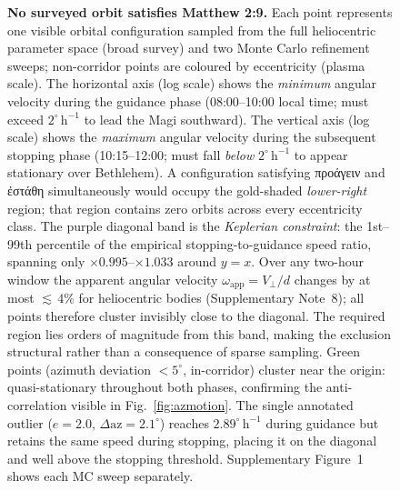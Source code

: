 \documentclass[sn-nature]{sn-jnl}
\newcommand{\grk}[1]{{\fontencoding{LGR}\selectfont #1}}
\newcommand{\grk}[1]{{\greekfont #1}}
\begin{document}
\begin{figure}[h!]
  \caption{\textbf{No surveyed orbit satisfies Matthew 2:9.}
    Each point represents one visible orbital configuration sampled from the
    full heliocentric parameter space (broad survey) and two Monte Carlo
    refinement sweeps; non-corridor points are coloured by eccentricity
    (plasma scale). The horizontal axis (log scale) shows the
    \emph{minimum} angular velocity during the guidance phase
    (08:00–10:00 local time; must exceed $2^\circ\,\mathrm{h}^{-1}$ to
    lead the Magi southward). The vertical axis (log scale) shows the
    \emph{maximum} angular velocity during the subsequent stopping phase
    (10:15–12:00; must fall \emph{below} $2^\circ\,\mathrm{h}^{-1}$ to
    appear stationary over Bethlehem). A configuration satisfying
    \grk{προάγειν} and \grk{ἐστάθη} simultaneously would occupy the
    gold-shaded \emph{lower-right} region; that region contains zero orbits
    across every eccentricity class.
    The purple diagonal band is the \emph{Keplerian constraint}: the
    1st--99th percentile of the empirical stopping-to-guidance speed ratio,
    spanning only $\times 0.995$--$\times 1.033$ around $y=x$.
    Over any two-hour window the apparent angular velocity
    $\omega_\mathrm{app} = V_\perp/d$ changes by at most ${\lesssim}\,4\%$
    for heliocentric bodies (Supplementary Note~8); all points therefore
    cluster invisibly close to the diagonal.
    The required region lies orders of magnitude from this band, making the
    exclusion structural rather than a consequence of sparse sampling.
    Green points (azimuth deviation $<5^\circ$, in-corridor) cluster near
    the origin: quasi-stationary throughout both phases, confirming the
    anti-correlation visible in Fig.~\ref{fig:azmotion}. The single
    annotated outlier ($e=2.0$, $\Delta\mathrm{az}=2.1^\circ$) reaches
    $2.89^\circ\,\mathrm{h}^{-1}$ during guidance but retains the same
    speed during stopping, placing it on the diagonal and well above the
    stopping threshold.
    Supplementary Figure~1 shows each MC sweep separately.}
  \label{fig:scatter}
\end{figure}
\end{document}
